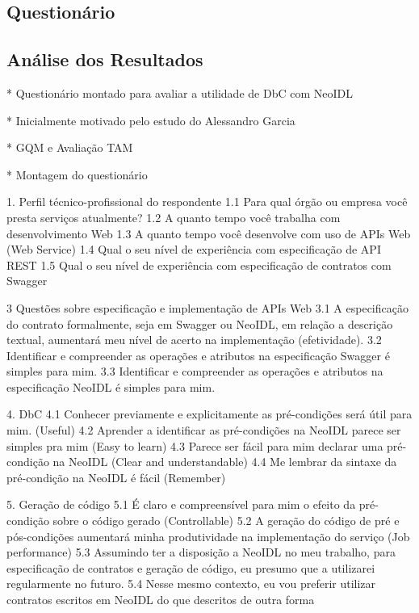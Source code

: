 \subsection{Questionário}
\vspace{-6mm}

\subsection{Análise dos Resultados}
\vspace{-6mm}


* Questionário montado para avaliar a utilidade de DbC com NeoIDL

* Inicialmente motivado pelo estudo do Alessandro Garcia

* GQM e Avaliação TAM

* Montagem do questionário

1. Perfil técnico-profissional do respondente
1.1 Para qual órgão ou empresa você presta serviços atualmente?
1.2 A quanto tempo você trabalha com desenvolvimento Web
1.3 A quanto tempo você desenvolve com uso de APIs Web (Web Service)
1.4 Qual o seu nível de experiência com especificação de API REST
1.5 Qual o seu nível de experiência com especificação de contratos com Swagger

3 Questões sobre especificação e implementação de APIs Web
3.1 A especificação do contrato formalmente, seja em Swagger ou NeoIDL, em
relação a descrição textual, aumentará meu nível de acerto na implementação (efetividade).
3.2 Identificar e compreender as operações e atributos na especificação Swagger
é simples para mim.
3.3 Identificar e compreender as operações e atributos na especificação NeoIDL é
simples para mim.

4. DbC
4.1 Conhecer previamente e explicitamente as pré-condições será útil para mim.
(Useful)
4.2 Aprender a identificar as pré-condições na NeoIDL parece ser simples pra mim
(Easy to learn)
4.3 Parece ser fácil para mim declarar uma pré-condição na NeoIDL
(Clear and understandable)
4.4 Me lembrar da sintaxe da pré-condição na NeoIDL é fácil  (Remember)

5. Geração de código
5.1 É claro e compreensível para mim o efeito da pré-condição sobre o código
gerado  (Controllable)
5.2 A geração do código de pré e pós-condições aumentará minha produtividade na
implementação do serviço (Job performance)
5.3 Assumindo ter a disposição a NeoIDL no meu trabalho, para especificação de
contratos e geração de código, eu presumo que a utilizarei regularmente no futuro.
5.4 Nesse mesmo contexto, eu vou preferir utilizar contratos escritos em NeoIDL
do que descritos de outra forma



